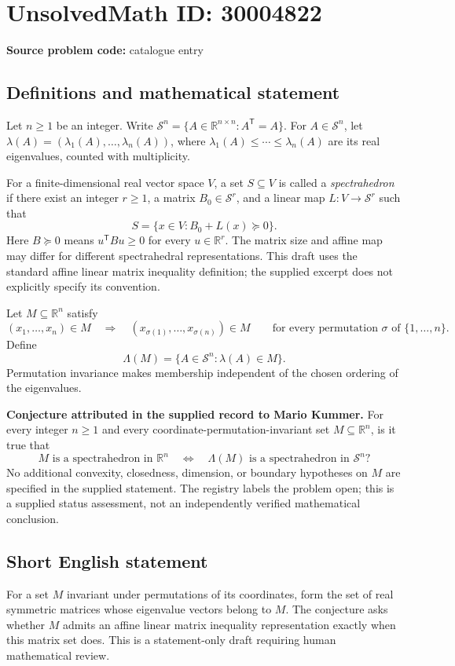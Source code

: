 \documentclass[11pt]{article}
\begin{document}
\section*{UnsolvedMath ID: 30004822}
\textbf{Source problem code:} catalogue entry
\subsection{Definitions and mathematical statement}
Let \(n\geq 1\) be an integer. Write \(\mathcal S^n=\{A\in\mathbb R^{n\times n}:A^{\mathsf T}=A\}\). For \(A\in\mathcal S^n\), let \(\lambda(A)=(\lambda_1(A),\ldots,\lambda_n(A))\), where \(\lambda_1(A)\leq\cdots\leq\lambda_n(A)\) are its real eigenvalues, counted with multiplicity.

For a finite-dimensional real vector space \(V\), a set \(S\subseteq V\) is called a \emph{spectrahedron} if there exist an integer \(r\geq1\), a matrix \(B_0\in\mathcal S^r\), and a linear map \(L:V\to\mathcal S^r\) such that
\[
S=\{x\in V:B_0+L(x)\succeq0\}.
\]
Here \(B\succeq0\) means \(u^{\mathsf T}Bu\geq0\) for every \(u\in\mathbb R^r\). The matrix size and affine map may differ for different spectrahedral representations. This draft uses the standard affine linear matrix inequality definition; the supplied excerpt does not explicitly specify its convention.

Let \(M\subseteq\mathbb R^n\) satisfy
\[
(x_1,\ldots,x_n)\in M
\quad\Longrightarrow\quad
(x_{\sigma(1)},\ldots,x_{\sigma(n)})\in M
\qquad\text{for every permutation }\sigma\text{ of }\{1,\ldots,n\}.
\]
Define
\[
\Lambda(M)=\{A\in\mathcal S^n:\lambda(A)\in M\}.
\]
Permutation invariance makes membership independent of the chosen ordering of the eigenvalues.

\textbf{Conjecture attributed in the supplied record to Mario Kummer.} For every integer \(n\geq1\) and every coordinate-permutation-invariant set \(M\subseteq\mathbb R^n\), is it true that
\[
M\text{ is a spectrahedron in }\mathbb R^n
\quad\Longleftrightarrow\quad
\Lambda(M)\text{ is a spectrahedron in }\mathcal S^n?
\]
No additional convexity, closedness, dimension, or boundary hypotheses on \(M\) are specified in the supplied statement. The registry labels the problem open; this is a supplied status assessment, not an independently verified mathematical conclusion.
\subsection{Short English statement}
For a set \(M\) invariant under permutations of its coordinates, form the set of real symmetric matrices whose eigenvalue vectors belong to \(M\). The conjecture asks whether \(M\) admits an affine linear matrix inequality representation exactly when this matrix set does. This is a statement-only draft requiring human mathematical review.
\end{document}
